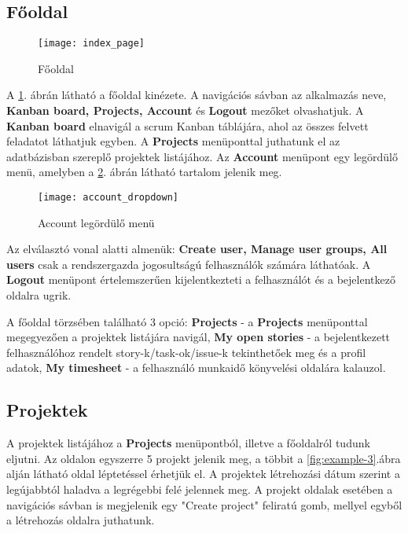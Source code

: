 \subsection{Főoldal}

\begin{figure}[H]
	\centering
	\texttt{[image: index\_page]}
	\caption{Főoldal}
	\label{fig:example-1}
\end{figure}

A \ref{fig:example-1}. ábrán látható a főoldal kinézete. A navigációs sávban az alkalmazás neve, \textbf{Kanban board, Projects, Account} és \textbf{Logout} mezőket olvashatjuk. A \textbf{Kanban board} elnavigál a scrum Kanban táblájára, ahol az összes felvett feladatot láthatjuk egyben. A \textbf{Projects} menüponttal juthatunk el az adatbázisban szereplő projektek listájához. Az \textbf{Account} menüpont egy legördülő menü, amelyben a \ref{fig:example-2}. ábrán látható tartalom jelenik meg.

\begin{figure}[H]
	\centering
	\texttt{[image: account\_dropdown]}
	\caption{Account legördülő menü}
	\label{fig:example-2}
\end{figure}

Az elválasztó vonal alatti almenük: \textbf{Create user,  Manage user groups, All users} csak a rendszergazda jogosultságú felhasználók számára láthatóak. A \textbf{Logout} menüpont értelemszerűen kijelentkezteti a felhasználót és a bejelentkező oldalra ugrik.

A főoldal törzsében található 3 opció: \textbf{Projects} - a \textbf{Projects} menüponttal megegyezően a projektek listájára navigál, \textbf{My open stories} - a bejelentkezett felhasználóhoz rendelt story-k/task-ok/issue-k tekinthetőek meg és a profil adatok, \textbf{My timesheet} - a felhasználó munkaidő könyvelési oldalára kalauzol.

\subsection{Projektek}
\label{projects}

A projektek listájához a \textbf{Projects} menüpontból, illetve a főoldalról tudunk eljutni. Az oldalon egyszerre 5 projekt jelenik meg, a többit a \ref{fig:example-3}.ábra alján látható oldal léptetéssel érhetjük el. A projektek létrehozási dátum szerint a legújabbtól haladva a legrégebbi felé jelennek meg. A projekt oldalak esetében a navigációs sávban is megjelenik egy "Create project" feliratú gomb, mellyel egyből a létrehozás oldalra juthatunk.


